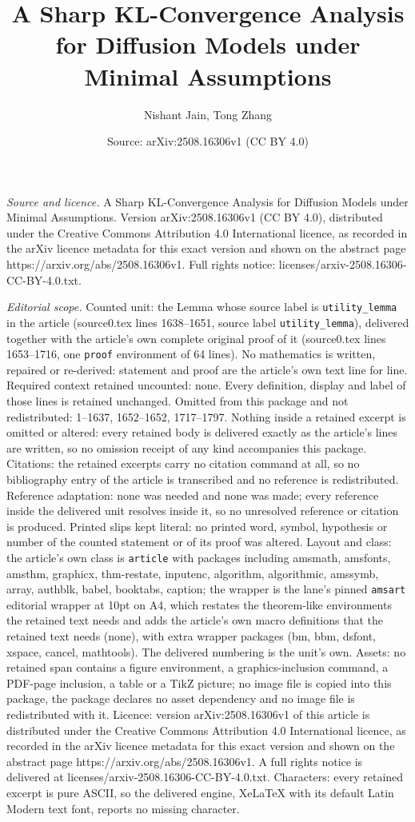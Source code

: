 \documentclass[10pt,a4paper]{amsart}
\title[A Sharp KL-Convergence Analysis for Diffusion Models under M]{A Sharp KL-Convergence Analysis for Diffusion Models under Minimal Assumptions}
\author{Nishant Jain, Tong Zhang}
\date{Source: arXiv:2508.16306v1 (CC BY 4.0)}
\begin{document}
\maketitle

\noindent\emph{Source and licence.} A Sharp KL-Convergence Analysis for Diffusion Models under Minimal Assumptions. Version arXiv:2508.16306v1 (CC BY 4.0), distributed under the Creative Commons Attribution 4.0 International licence, as recorded in the arXiv licence metadata for this exact version and shown on the abstract page https://arxiv.org/abs/2508.16306v1. Full rights notice: licenses/arxiv-2508.16306-CC-BY-4.0.txt.\par\smallskip

\noindent\textit{Editorial scope.} Counted unit: the Lemma whose source label is \texttt{utility\_lemma} in the article (source0.tex lines 1638--1651, source label \texttt{utility\_lemma}), delivered together with the article's own complete original proof of it (source0.tex lines 1653--1716, one \texttt{proof} environment of 64 lines). No mathematics is written, repaired or re-derived: statement and proof are the article's own text line for line. Required context retained uncounted: none. Every definition, display and label of those lines is retained unchanged. Omitted from this package and not redistributed: 1--1637, 1652--1652, 1717--1797. Nothing inside a retained excerpt is omitted or altered: every retained body is delivered exactly as the article's lines are written, so no omission receipt of any kind accompanies this package. Citations: the retained excerpts carry no citation command at all, so no bibliography entry of the article is transcribed and no reference is redistributed. Reference adaptation: none was needed and none was made; every reference inside the delivered unit resolves inside it, so no unresolved reference or citation is produced. Printed slips kept literal: no printed word, symbol, hypothesis or number of the counted statement or of its proof was altered. Layout and class: the article's own class is \texttt{article} with packages including amsmath, amsfonts, amsthm, graphicx, thm-restate, inputenc, algorithm, algorithmic, amssymb, array, authblk, babel, booktabs, caption; the wrapper is the lane's pinned \texttt{amsart} editorial wrapper at 10pt on A4, which restates the theorem-like environments the retained text needs and adds the article's own macro definitions that the retained text needs (none), with extra wrapper packages (bm, bbm, dsfont, xspace, cancel, mathtools). The delivered numbering is the unit's own. Assets: no retained span contains a figure environment, a graphics-inclusion command, a PDF-page inclusion, a table or a TikZ picture; no image file is copied into this package, the package declares no asset dependency and no image file is redistributed with it. Licence: version arXiv:2508.16306v1 of this article is distributed under the Creative Commons Attribution 4.0 International licence, as recorded in the arXiv licence metadata for this exact version and shown on the abstract page https://arxiv.org/abs/2508.16306v1. A full rights notice is delivered at licenses/arxiv-2508.16306-CC-BY-4.0.txt. Characters: every retained excerpt is pure ASCII, so the delivered engine, XeLaTeX with its default Latin Modern text font, reports no missing character.
\end{document}
